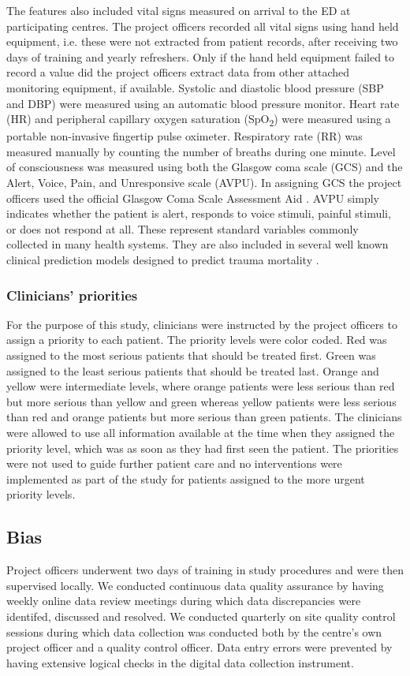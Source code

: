 \documentclass[10pt,letterpaper]{article}\usepackage[]{graphicx}\usepackage[]{color}
\begin{document}
The features also included vital signs measured on arrival to the ED at
participating centres. The project officers recorded all vital signs using hand
held equipment, i.e. these were not extracted from patient records, after
receiving two days of training and yearly refreshers. Only if the hand held
equipment failed to record a value did the project officers extract data from
other attached monitoring equipment, if available. Systolic and diastolic blood
pressure (SBP and DBP) were measured using an automatic blood pressure
monitor. Heart rate (HR) and peripheral capillary oxygen saturation
(SpO\textsubscript{2}) were measured using a portable non-invasive fingertip
pulse oximeter. Respiratory rate (RR) was measured manually by counting the
number of breaths during one minute. Level of consciousness was measured using
both the Glasgow coma scale (GCS) and the Alert, Voice, Pain, and Unresponsive
scale (AVPU). In assigning GCS the project officers used the official Glasgow
Coma Scale Assessment Aid \cite{GCSAID}. AVPU simply indicates whether the
patient is alert, responds to voice stimuli, painful stimuli, or does not
respond at all. These represent standard variables commonly collected in many
health systems. They are also included in several well known clinical prediction
models designed to predict trauma mortality \cite{Rehn2011}.

\subsubsection*{Clinicians' priorities}
For the purpose of this study, clinicians were instructed by the project
officers to assign a priority to each patient. The priority levels were color
coded. Red was assigned to the most serious patients that should be treated
first. Green was assigned to the least serious patients that should be treated
last. Orange and yellow were intermediate levels, where orange patients were
less serious than red but more serious than yellow and green whereas yellow
patients were less serious than red and orange patients but more serious than
green patients. The clinicians were allowed to use all information available at
the time when they assigned the priority level, which was as soon as they had first
seen the patient. The priorities were not used to guide further patient care and
no interventions were implemented as part of the study for patients assigned to
the more urgent priority levels.

\subsection*{Bias}
Project officers underwent two days of training in study procedures and were
then supervised locally. We conducted continuous data quality assurance by having
weekly online data review meetings during which data discrepancies were
identifed, discussed and resolved. We conducted quarterly on site quality
control sessions during which data collection was conducted both by the centre's
own project officer and a quality control officer. Data entry errors were
prevented by having extensive logical checks in the digital data collection
instrument.
\end{document}
